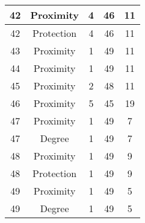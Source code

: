 \documentclass[results.tex]{subfiles}
\begin{document}
\begin{center}
\begin{tabular}{| c || c | c | c | c |}
            \hline
            42                      & Proximity                    & 4                      & 46                      & 11                   \\
            \hline
            42                      & Protection                   & 4                      & 46                      & 11                   \\
            \hline
            43                      & Proximity                    & 1                      & 49                      & 11                   \\
            \hline
            44                      & Proximity                    & 1                      & 49                      & 11                   \\
            \hline
            45                      & Proximity                    & 2                      & 48                      & 11                   \\
            \hline
            46                      & Proximity                    & 5                      & 45                      & 19                   \\
            \hline
            47                      & Proximity                    & 1                      & 49                      & 7                    \\
            \hline
            47                      & Degree                       & 1                      & 49                      & 7                    \\
            \hline
            48                      & Proximity                    & 1                      & 49                      & 9                    \\
            \hline
            48                      & Protection                   & 1                      & 49                      & 9                    \\
            \hline
            49                      & Proximity                    & 1                      & 49                      & 5                    \\
            \hline
            49                      & Degree                       & 1                      & 49                      & 5                    \\
            \hline
        \end{tabular}
    \end{center}
\end{document}
